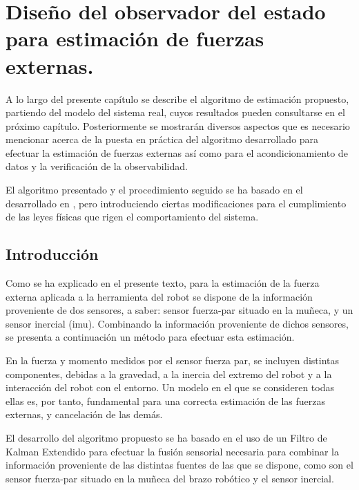 \chapter[Diseño del observador del estado para estimación de fuerzas]{Diseño del observador del estado para estimación de fuerzas externas.}
\label{chap:disenoObservador}

A lo largo del presente capítulo se describe el algoritmo de estimación propuesto, partiendo del modelo del sistema real, cuyos resultados pueden consultarse en el próximo capítulo. Posteriormente se mostrarán diversos aspectos que es necesario mencionar acerca de la puesta en práctica del algoritmo desarrollado para efectuar la estimación de fuerzas externas así como para el acondicionamiento de datos y la verificación de la observabilidad. \par 

El algoritmo presentado y el procedimiento seguido se ha basado en el desarrollado en \cite{garcia2008sensor}, pero introduciendo ciertas modificaciones para el cumplimiento de las leyes físicas que rigen el comportamiento del sistema. \par 

\newpage
\section{Introducción}

Como se ha explicado en el presente texto, para la estimación de la fuerza externa aplicada a la herramienta del robot se dispone de la información proveniente de dos sensores, a saber: sensor fuerza-par situado en la muñeca, y un sensor inercial (\acrshort{imu}). Combinando la información proveniente de dichos sensores, se presenta a continuación un método para efectuar esta estimación.\par

En la fuerza y momento medidos por el sensor fuerza par, se incluyen distintas componentes, debidas a la gravedad, a la inercia del extremo del robot y a la interacción del robot con el entorno. Un modelo en el que se consideren todas ellas es, por tanto, fundamental para una correcta estimación de las fuerzas externas, y cancelación de las demás.\par

El desarrollo del algoritmo propuesto se ha basado en el uso de un Filtro de Kalman Extendido para efectuar la fusión sensorial necesaria para combinar la información proveniente de las distintas fuentes de las que se dispone, como son el sensor fuerza-par situado en la muñeca del brazo robótico y el sensor inercial.\par

